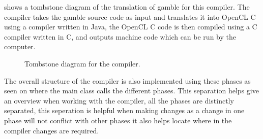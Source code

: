  shows a tombstone diagram of the translation of \gls{gamble} for this compiler.
The compiler takes the \gls{gamble} source code as input and translates it into OpenCL C using a compiler written in Java, the OpenCL C code is then compiled using a C compiler written in C, and outputs machine code which can be run by the computer.
\begin{figure}[!ht]
\centering
{}
\caption{Tombstone diagram for the compiler.}
\label{fig:tombstone}
\end{figure}


The overall structure of the compiler is also implemented using these phases as seen on  where the main class calls the different phases.
This separation helps give an overview when working with the compiler, all the phases are distinctly separated, this seperation is helpful when making changes as a change in one phase will not conflict with other phases it also helps locate where in the compiler changes are required.

